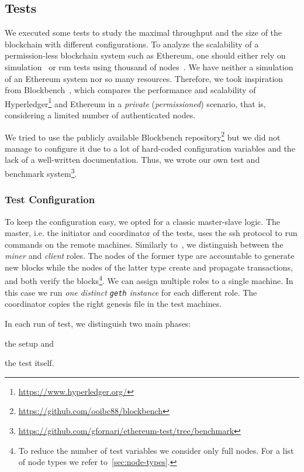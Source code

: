 \subsection{Tests}
\label{sec:tests}

We executed some tests to study the maximal throughput and the size of the
blockchain with different configurations. To analyze the scalability of a
permission-less blockchain system such as Ethereum, one should either rely on
simulation~\cite{bib:securityAndScalabilityPoW} or run tests using thousand of
nodes~\cite{bib:securityAndScalabilityPoW, bib:algorand}. We have neither a
simulation of an Ethereum system nor so many resources. Therefore, we took
inspiration from Blockbench~\cite{blockbench}, which compares the performance
and scalability of Hyperledger\footnote{\url{https://www.hyperledger.org/}} and
Ethereum in a \emph{private} (\emph{permissioned}) scenario, that is,
considering a limited number of authenticated nodes.

We tried to use the publicly available Blockbench
repository\footnote{\url{https://github.com/ooibc88/blockbench}} but we did not
manage to configure it due to a lot of hard-coded configuration variables and
the lack of a well-written documentation. Thus, we wrote our own test and
benchmark
system\footnote{\url{https://github.com/gfornari/ethereum-test/tree/benchmark}}.


\subsubsection{Test Configuration}

To keep the configuration easy, we opted for a classic master-slave logic. The
master, i.e. the initiator and coordinator of the tests, uses the ssh protocol
to run commands on the remote machines. Similarly to~\cite{blockbench}, we
distinguish between the \emph{miner} and \emph{client} roles. The nodes of the
former type are accountable to generate new blocks while the nodes of the latter
type create and propagate transactions, and both verify the blocks\footnote{To
reduce the number of test variables we consider only full nodes. For a list of
node types we refer to~\autoref{sec:node-types}.}. We can assign multiple roles
to a single machine. In this case we run \emph{one distinct \texttt{geth}
instance} for each different role. The coordinator copies the right genesis file
in the test machines.

In each run of test, we distinguish two main phases:
\begin{enumerate*}
  \item the setup and
  \item the test itself.
\end{enumerate*}

